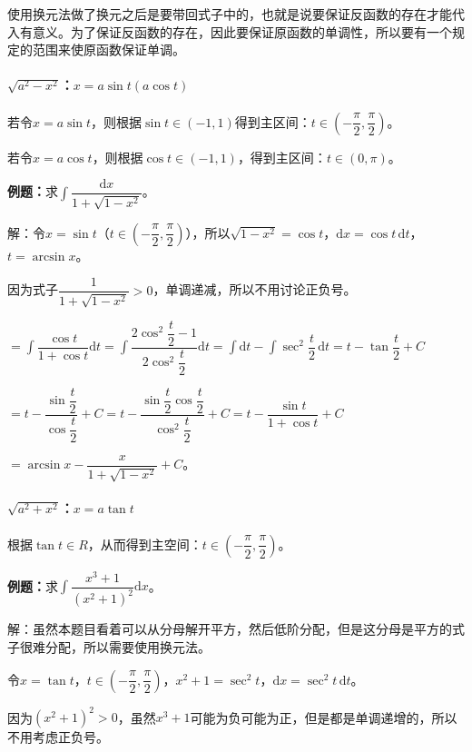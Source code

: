 \documentclass[UTF8, 12pt]{ctexart}
\begin{document}
使用换元法做了换元之后是要带回式子中的，也就是说要保证反函数的存在才能代入有意义。为了保证反函数的存在，因此要保证原函数的单调性，所以要有一个规定的范围来使原函数保证单调。

\paragraph{\texorpdfstring{$\sqrt{a^2-x^2}$：$x=a\sin t(a\cos t)$}\ } \leavevmode \medskip

若令$x=a\sin t$，则根据$\sin t\in(-1,1)$得到主区间：$t\in\left(-\dfrac{\pi}{2},\dfrac{\pi}{2}\right)$。

若令$x=a\cos t$，则根据$\cos t\in(-1,1)$，得到主区间：$t\in(0,\pi)$。

\textbf{例题：}求$\displaystyle{\int\dfrac{\textrm{d}x}{1+\sqrt{1-x^2}}}$。\medskip

解：令$x=\sin t$（$t\in\left(-\dfrac{\pi}{2},\dfrac{\pi}{2}\right)$），所以$\sqrt{1-x^2}=\cos t$，$\textrm{d}x=\cos t\,\textrm{d}t$，$t=\arcsin x$。

因为式子$\dfrac{1}{1+\sqrt{1-x^2}}>0$，单调递减，所以不用讨论正负号。

$=\displaystyle{\int\dfrac{\cos t}{1+\cos t}\textrm{d}t=\int\dfrac{2\cos^2\dfrac{t}{2}-1}{2\cos^2\dfrac{t}{2}}\textrm{d}t=\int\textrm{d}t-\int\sec^2\dfrac{t}{2}\,\textrm{d}t=t-\tan}\dfrac{t}{2}+C$

$=t-\dfrac{\sin\dfrac{t}{2}}{\cos\dfrac{t}{2}}+C=t-\dfrac{\sin\dfrac{t}{2}\cos\dfrac{t}{2}}{\cos^2\dfrac{t}{2}}+C=t-\dfrac{\sin t}{1+\cos t}+C$

$=\arcsin x-\dfrac{x}{1+\sqrt{1-x^2}}+C$。

\paragraph{\texorpdfstring{$\sqrt{a^2+x^2}$：$x=a\tan t$}\ } \leavevmode \medskip

根据$\tan t\in R$，从而得到主空间：$t\in\left(-\dfrac{\pi}{2},\dfrac{\pi}{2}\right)$。

\textbf{例题：}求$\displaystyle{\int\dfrac{x^3+1}{(x^2+1)^2}\textrm{d}x}$。\medskip

解：虽然本题目看着可以从分母解开平方，然后低阶分配，但是这分母是平方的式子很难分配，所以需要使用换元法。

令$x=\tan t$，$t\in\left(-\dfrac{\pi}{2},\dfrac{\pi}{2}\right)$，$x^2+1=\sec^2t$，$\textrm{d}x=\sec^2t\,\textrm{d}t$。

因为$(x^2+1)^2>0$，虽然$x^3+1$可能为负可能为正，但是都是单调递增的，所以不用考虑正负号。
\end{document}
